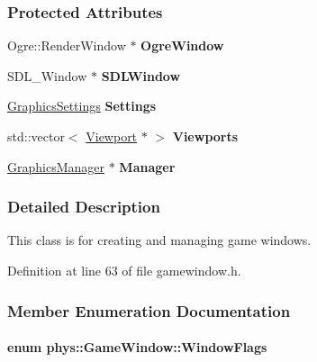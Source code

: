 \subsubsection*{Protected Attributes}
\begin{DoxyCompactItemize}
\item 
\hypertarget{classphys_1_1GameWindow_a0d8246623e8eec745b03f029215b2a6b}{
Ogre::RenderWindow $\ast$ {\bfseries OgreWindow}}
\label{dc/d4f/classphys_1_1GameWindow_a0d8246623e8eec745b03f029215b2a6b}

\item 
\hypertarget{classphys_1_1GameWindow_aa1d07338b6b6fd40b2fc7b6c813d721e}{
SDL\_\-Window $\ast$ {\bfseries SDLWindow}}
\label{dc/d4f/classphys_1_1GameWindow_aa1d07338b6b6fd40b2fc7b6c813d721e}

\item 
\hypertarget{classphys_1_1GameWindow_a1dba5999dd50a73b46b7aa0f53e7e529}{
\hyperlink{structphys_1_1GraphicsSettings}{GraphicsSettings} {\bfseries Settings}}
\label{dc/d4f/classphys_1_1GameWindow_a1dba5999dd50a73b46b7aa0f53e7e529}

\item 
\hypertarget{classphys_1_1GameWindow_a64b3471c627e82f4f66eb25d1db2893a}{
std::vector$<$ \hyperlink{classphys_1_1Viewport}{Viewport} $\ast$ $>$ {\bfseries Viewports}}
\label{dc/d4f/classphys_1_1GameWindow_a64b3471c627e82f4f66eb25d1db2893a}

\item 
\hypertarget{classphys_1_1GameWindow_aace5dc5e9cf498b22b9a905af66a7a4f}{
\hyperlink{classphys_1_1GraphicsManager}{GraphicsManager} $\ast$ {\bfseries Manager}}
\label{dc/d4f/classphys_1_1GameWindow_aace5dc5e9cf498b22b9a905af66a7a4f}

\end{DoxyCompactItemize}


\subsubsection{Detailed Description}
This class is for creating and managing game windows. 

Definition at line 63 of file gamewindow.h.



\subsubsection{Member Enumeration Documentation}
\hypertarget{classphys_1_1GameWindow_ae4c6f1cc436ac9f20e43bd21a99885f5}{
\paragraph[{WindowFlags}]{\setlength{\rightskip}{0pt plus 5cm}enum {\bf phys::GameWindow::WindowFlags}}\hfill}
\label{dc/d4f/classphys_1_1GameWindow_ae4c6f1cc436ac9f20e43bd21a99885f5}


